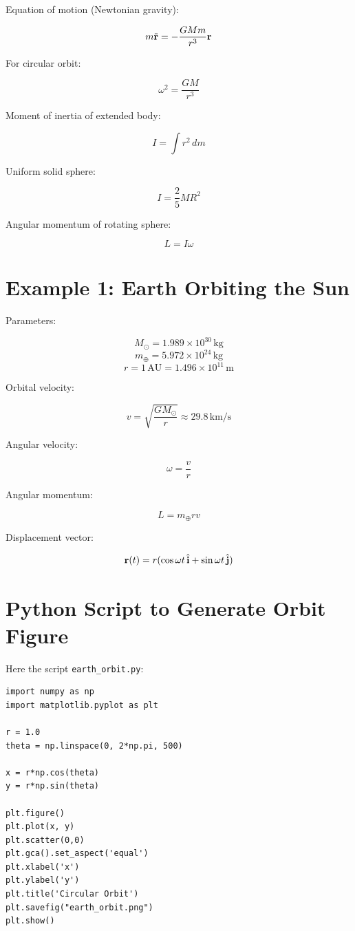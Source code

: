 \documentclass[14pt,a4paper]{article}
\begin{document}
Equation of motion (Newtonian gravity):

\[
m\ddot{\vb{r}} = -\frac{GMm}{r^3}\vb{r}
\]

For circular orbit:

\[
\omega^2 = \frac{GM}{r^3}
\]

Moment of inertia of extended body:

\[
I = \int r^2 \, dm
\]

Uniform solid sphere:

\[
I = \frac{2}{5}MR^2
\]

Angular momentum of rotating sphere:

\[
L = I\omega
\]


\section{Example 1: Earth Orbiting the Sun}

Parameters:

\[
M_\odot = 1.989\times10^{30}\,\text{kg}
\]
\[
m_\oplus = 5.972\times10^{24}\,\text{kg}
\]
\[
r = 1\,\text{AU} = 1.496\times10^{11}\,\text{m}
\]

Orbital velocity:

\[
v = \sqrt{\frac{GM_\odot}{r}} \approx 29.8\,\text{km/s}
\]

Angular velocity:

\[
\omega = \frac{v}{r}
\]

Angular momentum:

\[
L = m_\oplus r v
\]

Displacement vector:

\[
\vb{r}(t) = r(\cos\omega t\,\hat{\vb{i}} + \sin\omega t\,\hat{\vb{j}})
\]

\section{Python Script to Generate Orbit Figure}

Here the script \verb|earth_orbit.py|:

\begin{verbatim}
import numpy as np
import matplotlib.pyplot as plt

r = 1.0
theta = np.linspace(0, 2*np.pi, 500)

x = r*np.cos(theta)
y = r*np.sin(theta)

plt.figure()
plt.plot(x, y)
plt.scatter(0,0)
plt.gca().set_aspect('equal')
plt.xlabel('x')
plt.ylabel('y')
plt.title('Circular Orbit')
plt.savefig("earth_orbit.png")
plt.show()
\end{verbatim}
\end{document}
